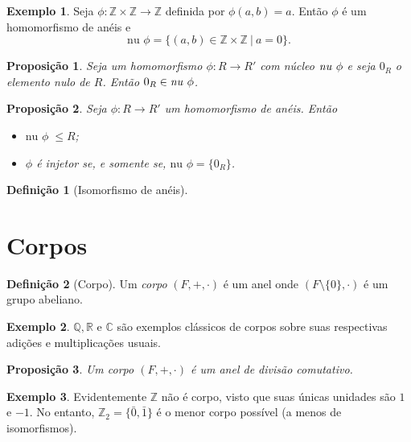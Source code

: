 \documentclass[a4paper,12pt]{report}
\theoremstyle{plain}
\newtheorem{proposicao}{Proposição}[section]
\theoremstyle{definition}
\newtheorem{definicao}{Definição}[section]
\newtheorem{exemplo}{Exemplo}[section]
\begin{document}
\begin{exemplo}
	Seja $\phi: \mathbb{Z}\times \mathbb{Z} \longrightarrow \mathbb{Z}$ definida por $\phi(a,b) = a$. Então $\phi$ é um homomorfismo de anéis e
	$$\text{nu }\phi = \{(a,b) \in \mathbb{Z}\times \mathbb{Z} \ | \ a = 0\}.$$
\end{exemplo}

\begin{proposicao}
	Seja um homomorfismo $\phi:R\longrightarrow R'$ com núcleo $\text{\emph{nu} }\phi$ e seja $0_R$ o elemento nulo de $R$. Então $0_R \in \text{\emph{nu} }\phi$.
\end{proposicao}

\begin{proposicao}
	Seja $\phi: R \longrightarrow R'$ um homomorfismo de anéis. Então 
	\begin{itemize}
		\item $\text{nu } \phi\; \leq R$;
		\item $\phi$ é injetor se, e somente se, $\text{nu }\phi = \{0_R\}$.
	\end{itemize}
\end{proposicao}

\begin{definicao}[Isomorfismo de anéis]
	 
\end{definicao}


\section{Corpos}

\begin{definicao}[Corpo]
	Um \emph{corpo} $(F,+,\cdot)$ é um anel onde $(F\setminus\{0\},\cdot)$ é um grupo abeliano.
\end{definicao}

\begin{exemplo}
	$\mathbb{Q}, \mathbb{R}$ e $\mathbb{C}$ são exemplos clássicos de corpos sobre suas respectivas adições e multiplicações usuais.
\end{exemplo}

\begin{proposicao}
	Um corpo $(F, +, \cdot)$ é um anel de divisão comutativo.
\end{proposicao}

\begin{exemplo}
	Evidentemente $\mathbb{Z}$ não é corpo, visto que suas únicas unidades são $1$ e $-1$. 
	No entanto, $\mathbb{Z}_2 = \{\bar 0,\bar 1\}$ é o menor corpo possível (a menos de isomorfismos).
\end{exemplo}
\end{document}
